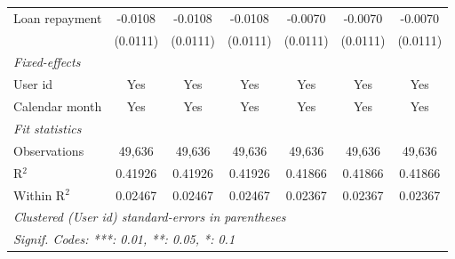 \begin{table}[htbp]
\begin{footnotesize}
\begin{tabular}{lcccccc}
         Loan repayment                   & -0.0108        & -0.0108        & -0.0108        & -0.0070        & -0.0070        & -0.0070\\
                                          & (0.0111)       & (0.0111)       & (0.0111)       & (0.0111)       & (0.0111)       & (0.0111)\\
         \midrule \emph{Fixed-effects} &   &   &   &   &   &  \\
         User id                          & Yes            & Yes            & Yes            & Yes            & Yes            & Yes\\
         Calendar month                   & Yes            & Yes            & Yes            & Yes            & Yes            & Yes\\
         \midrule \emph{Fit statistics} &   &   &   &   &   &  \\
         Observations                     & 49,636         & 49,636         & 49,636         & 49,636         & 49,636         & 49,636\\
         R$^2$                            & 0.41926        & 0.41926        & 0.41926        & 0.41866        & 0.41866        & 0.41866\\
         Within R$^2$                     & 0.02467        & 0.02467        & 0.02467        & 0.02367        & 0.02367        & 0.02367\\
         \midrule\midrule\multicolumn{7}{l}{\emph{Clustered (User id) standard-errors in parentheses}}\\
         \multicolumn{7}{l}{\emph{Signif. Codes: ***: 0.01, **: 0.05, *: 0.1}}\\
      \end{tabular}
   \end{footnotesize}
\end{table}


